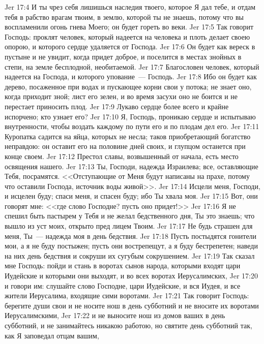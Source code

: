\vs Jer 17:4 И ты чрез себя лишишься наследия твоего, которое Я дал тебе, и отдам тебя в рабство врагам твоим, в землю, которой ты не знаешь, потому что вы воспламенили огонь гнева Моего; он будет гореть во веки.
\rsbpar\vs Jer 17:5 Так говорит Господь: проклят человек, который надеется на человека и плоть делает своею опорою, и которого сердце удаляется от Господа.
\vs Jer 17:6 Он будет как вереск в пустыне и не увидит, когда придет доброе, и поселится в местах знойных в степи, на земле бесплодной, необитаемой.
\vs Jer 17:7 Благословен человек, который надеется на Господа, и которого упование~--- Господь.
\vs Jer 17:8 Ибо он будет как дерево, посаженное при водах и пускающее корни свои у потока; не знает оно, когда приходит зной; лист его зелен, и во время засухи оно не боится и не перестает приносить плод.
\vs Jer 17:9 Лукаво сердце  более всего и крайне испорчено; кто узнает его?
\vs Jer 17:10 Я, Господь, проникаю сердце и испытываю внутренности, чтобы воздать каждому по пути его и по плодам дел его.
\vs Jer 17:11 Куропатка садится на яйца, которых не несла; таков приобретающий богатство неправдою: он оставит его на половине дней своих, и глупцом останется при конце своем.
\vs Jer 17:12 Престол славы, возвышенный от начала, есть место освящения нашего.
\vs Jer 17:13 Ты, Господи, надежда Израилева; все, оставляющие Тебя, посрамятся. <<Отступающие от Меня будут написаны на прахе, потому что оставили Господа, источник воды живой>>.
\vs Jer 17:14 Исцели меня, Господи, и исцелен буду; спаси меня, и спасен буду; ибо Ты хвала моя.
\vs Jer 17:15 Вот, они говорят мне: <<где слово Господне? пусть оно придет!>>
\vs Jer 17:16 Я не спешил быть пастырем у Тебя и не желал бедственного дня, Ты это знаешь; что вышло из уст моих, открыто пред лицем Твоим.
\vs Jer 17:17 Не будь страшен для меня, Ты~--- надежда моя в день бедствия.
\vs Jer 17:18 Пусть постыдятся гонители мои, а я не буду постыжен; пусть они вострепещут, а я буду бестрепетен; наведи на них день бедствия и сокруши их сугубым сокрушением.
\rsbpar\vs Jer 17:19 Так сказал мне Господь: пойди и стань в воротах сынов народа, которыми входят цари Иудейские и которыми они выходят, и во всех воротах Иерусалимских,
\vs Jer 17:20 и говори им: слушайте слово Господне, цари Иудейские, и вся Иудея, и все жители Иерусалима, входящие сими воротами.
\vs Jer 17:21 Так говорит Господь: берегите души свои и не носите нош в день субботний и не вносите их воротами Иерусалимскими,
\vs Jer 17:22 и не выносите нош из домов ваших в день субботний, и не занимайтесь никакою работою, но святите день субботний так, как Я заповедал отцам вашим,

